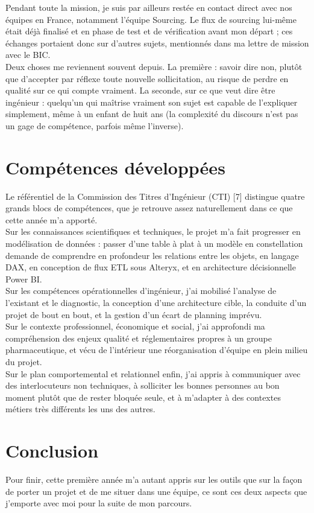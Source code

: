 Pendant toute la mission, je suis par ailleurs restée en contact direct avec nos équipes 
en France, notamment l'équipe Sourcing. Le flux de sourcing lui-même était déjà finalisé et 
en phase de test et de vérification avant mon départ ; ces échanges portaient donc sur 
d'autres sujets, mentionnés dans ma lettre de mission avec le BIC. \\

Deux choses me reviennent souvent depuis. La première : savoir dire non, plutôt que 
d'accepter par réflexe toute nouvelle sollicitation, au risque de perdre en qualité sur ce qui 
compte vraiment. La seconde, sur ce que veut dire être ingénieur : quelqu'un qui maîtrise 
vraiment son sujet est capable de l'expliquer simplement, même à un enfant de huit ans (la 
complexité du discours n'est pas un gage de compétence, parfois même l'inverse).

\section{Compétences développées}

Le référentiel de la Commission des Titres d'Ingénieur (CTI) [7] distingue quatre grands 
blocs de compétences, que je retrouve assez naturellement dans ce que cette année m'a 
apporté. \\

Sur les connaissances scientifiques et techniques, le projet m'a fait progresser en 
modélisation de données : passer d'une table à plat à un modèle en constellation demande 
de comprendre en profondeur les relations entre les objets, en langage DAX, en conception 
de flux ETL sous Alteryx, et en architecture décisionnelle Power BI. \\

Sur les compétences opérationnelles d'ingénieur, j'ai mobilisé l'analyse de l'existant et 
le diagnostic, la conception d'une architecture cible, la conduite d'un projet de bout en bout, 
et la gestion d'un écart de planning imprévu. \\

Sur le contexte professionnel, économique et social, j'ai approfondi ma compréhension 
des enjeux qualité et réglementaires propres à un groupe pharmaceutique, et vécu de 
l'intérieur une réorganisation d'équipe en plein milieu du projet. \\

Sur le plan comportemental et relationnel enfin, j'ai appris à communiquer avec des 
interlocuteurs non techniques, à solliciter les bonnes personnes au bon moment plutôt que 
de rester bloquée seule, et à m'adapter à des contextes métiers très différents les uns des 
autres.

\section{Conclusion}
Pour finir, cette première année m'a autant appris sur les outils que sur la façon de 
porter un projet et de me situer dans une équipe, ce sont ces deux aspects que j'emporte 
avec moi pour la suite de mon parcours. 
